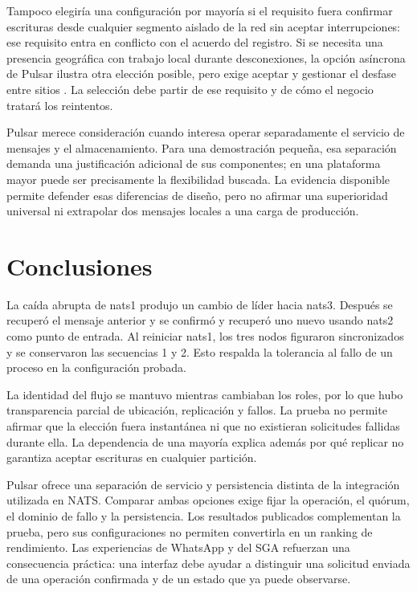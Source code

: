 \documentclass[11pt,a4paper]{article}
\begin{document}
Tampoco elegiría una configuración por mayoría si el requisito fuera confirmar escrituras desde cualquier segmento aislado de la red sin aceptar interrupciones: ese requisito entra en conflicto con el acuerdo del registro. Si se necesita una presencia geográfica con trabajo local durante desconexiones, la opción asíncrona de Pulsar ilustra otra elección posible, pero exige aceptar y gestionar el desfase entre sitios \cite{pulsarGeo}. La selección debe partir de ese requisito y de cómo el negocio tratará los reintentos.

Pulsar merece consideración cuando interesa operar separadamente el servicio de mensajes y el almacenamiento. Para una demostración pequeña, esa separación demanda una justificación adicional de sus componentes; en una plataforma mayor puede ser precisamente la flexibilidad buscada. La evidencia disponible permite defender esas diferencias de diseño, pero no afirmar una superioridad universal ni extrapolar dos mensajes locales a una carga de producción.

\section{Conclusiones}
La caída abrupta de nats1 produjo un cambio de líder hacia nats3. Después se recuperó el mensaje anterior y se confirmó y recuperó uno nuevo usando nats2 como punto de entrada. Al reiniciar nats1, los tres nodos figuraron sincronizados y se conservaron las secuencias 1 y 2. Esto respalda la tolerancia al fallo de un proceso en la configuración probada.

La identidad del flujo se mantuvo mientras cambiaban los roles, por lo que hubo transparencia parcial de ubicación, replicación y fallos. La prueba no permite afirmar que la elección fuera instantánea ni que no existieran solicitudes fallidas durante ella. La dependencia de una mayoría explica además por qué replicar no garantiza aceptar escrituras en cualquier partición.

Pulsar ofrece una separación de servicio y persistencia distinta de la integración utilizada en NATS. Comparar ambas opciones exige fijar la operación, el quórum, el dominio de fallo y la persistencia. Los resultados publicados complementan la prueba, pero sus configuraciones no permiten convertirla en un ranking de rendimiento. Las experiencias de WhatsApp y del SGA refuerzan una consecuencia práctica: una interfaz debe ayudar a distinguir una solicitud enviada de una operación confirmada y de un estado que ya puede observarse.
\end{document}
